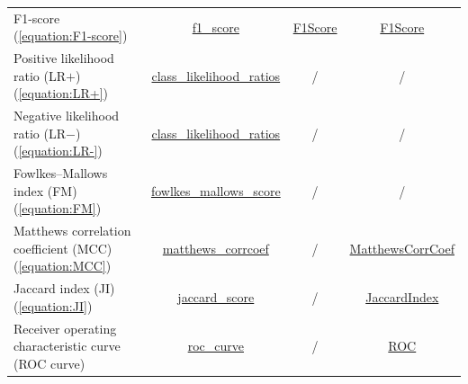 \documentclass{article}
\begin{document}
\begin{table}[H]
{\begin{tabular}{|l|c|c|c|}
        F1-score (\ref{equation:F1-score})
        &
        \href{https://scikit-learn.org/stable/modules/generated/sklearn.metrics.f1_score.html\#sklearn.metrics.f1_score}{f1\_score}
        &
        \href{https://www.tensorflow.org/api_docs/python/tf/keras/metrics/F1Score}{F1Score}
        &
        \href{https://torchmetrics.readthedocs.io/en/latest/classification/f1_score.html}{F1Score}
        \\

        Positive likelihood ratio (LR$+$) (\ref{equation:LR+})
        &
        \href{https://scikit-learn.org/stable/modules/generated/sklearn.metrics.class_likelihood_ratios.html\#sklearn.metrics.class_likelihood_ratios}{class\_likelihood\_ratios}
        &
        /
        &
        /
        \\

        Negative likelihood ratio (LR$-$) (\ref{equation:LR-})
        &
        \href{https://scikit-learn.org/stable/modules/generated/sklearn.metrics.class_likelihood_ratios.html\#sklearn.metrics.class_likelihood_ratios}{class\_likelihood\_ratios}
        &
        /
        &
        /
        \\

        Fowlkes--Mallows index (FM) (\ref{equation:FM})
        &
        \href{https://scikit-learn.org/stable/modules/generated/sklearn.metrics.fowlkes_mallows_score.html\#sklearn.metrics.fowlkes_mallows_score}{fowlkes\_mallows\_score}
        &
        /
        &
        /
        \\

        Matthews correlation coefficient (MCC) (\ref{equation:MCC})
        &
        \href{https://scikit-learn.org/stable/modules/generated/sklearn.metrics.matthews_corrcoef.html\#sklearn.metrics.matthews_corrcoef}{matthews\_corrcoef}
        &
        /
        &
        \href{https://torchmetrics.readthedocs.io/en/latest/classification/matthews_corr_coef.html}{MatthewsCorrCoef}
        \\

        Jaccard index (JI) (\ref{equation:JI})
        &
        \href{https://scikit-learn.org/stable/modules/generated/sklearn.metrics.jaccard_score.html\#sklearn.metrics.jaccard_score}{jaccard\_score}
        &
        /
        &
        \href{https://torchmetrics.readthedocs.io/en/latest/classification/jaccard_index.html}{JaccardIndex}
        \\

        Receiver operating characteristic curve (ROC curve)
        &
        \href{https://scikit-learn.org/stable/modules/generated/sklearn.metrics.roc_curve.html\#sklearn.metrics.roc_curve}{roc\_curve}
        &
        /
        &
        \href{https://torchmetrics.readthedocs.io/en/latest/classification/roc.html}{ROC}
        \\


\end{tabular}}
\end{table}
\end{document}
